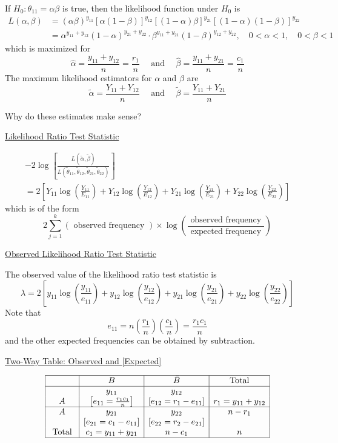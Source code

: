 If $H_{0}: \theta_{11}=\alpha \beta$ is true, then the likelihood function under $H_{0}$ is
\[
\begin{aligned}
L(\alpha, \beta) &=(\alpha \beta)^{y_{11}}[\alpha(1-\beta)]^{y_{12}}[(1-\alpha) \beta]^{y_{21}}[(1-\alpha)(1-\beta)]^{y_{22}} \\
&=\alpha^{y_{11}+y_{12}}(1-\alpha)^{y_{21}+y_{22}} \cdot \beta^{y_{11}+y_{21}}(1-\beta)^{y_{12}+y_{22}}, \quad 0<\alpha<1, \quad 0<\beta<1
\end{aligned}
\]
which is maximized for
\[
\hat{\alpha}=\frac{y_{11}+y_{12}}{n}=\frac{r_{1}}{n} \quad \text { and } \quad \hat{\beta}=\frac{y_{11}+y_{21}}{n}=\frac{c_{1}}{n}
\]
The maximum likelihood estimators for $\alpha$ and $\beta$ are
\[
\tilde{\alpha}=\frac{Y_{11}+Y_{12}}{n} \quad \text { and } \quad \tilde{\beta}=\frac{Y_{11}+Y_{21}}{n}
\]

Why do these estimates make sense?

\underline{Likelihood Ratio Test Statistic}

\[
\begin{array}{c}
-2 \log \left[\frac{L(\tilde{\alpha}, \tilde{\beta})}{L\left(\tilde{\theta}_{11}, \tilde{\theta}_{12}, \tilde{\theta}_{21}, \tilde{\theta}_{22}\right)}\right] \\
=2\left[Y_{11} \log \left(\frac{Y_{11}}{E_{11}}\right)+Y_{12} \log \left(\frac{Y_{12}}{E_{12}}\right)+Y_{21} \log \left(\frac{Y_{21}}{E_{21}}\right)+Y_{22} \log \left(\frac{Y_{22}}{E_{22}}\right)\right]
\end{array}
\]
which is of the form
\[
2 \sum_{j=1}^{k}(\text { observed frequency }) \times \log \left(\frac{\text { observed frequency }}{\text { expected frequency }}\right)
\]

\underline{Observed Likelihood Ratio Test Statistic}

The observed value of the likelihood ratio test statistic is
\[
\lambda=2\left[y_{11} \log \left(\frac{y_{11}}{e_{11}}\right)+y_{12} \log \left(\frac{y_{12}}{e_{12}}\right)+y_{21} \log \left(\frac{y_{21}}{e_{21}}\right)+y_{22} \log \left(\frac{y_{22}}{e_{22}}\right)\right]
\]
Note that
\[
e_{11}=n\left(\frac{r_{1}}{n}\right)\left(\frac{c_{1}}{n}\right)=\frac{r_{1} c_{1}}{n}
\]
and the other expected frequencies can be obtained by subtraction.

\underline{Two-Way Table: Observed and [Expected]}

\[ \begin{array}{|c|c|c|c|}
    \hline & B & \bar{B} & \text { Total } \\
    \hline
    & y_{11} & y_{12} & \\
    A & {\left[e_{11}=\frac{r_{1} c_{1}}{n}\right]} & {\left[e_{12}=r_{1}-e_{11}\right]} & r_{1}=y_{11}+y_{12} \\
    \hline A & y_{21} & y_{22} & n-r_{1} \\
    & {\left[e_{21}=c_{1}-e_{11}\right]} & {\left[e_{22}=r_{2}-e_{21}\right]} & \\
    \text { Total } & c_{1}=y_{11}+y_{21} & n-c_{1} & n \\
    \hline
    \end{array} \]

